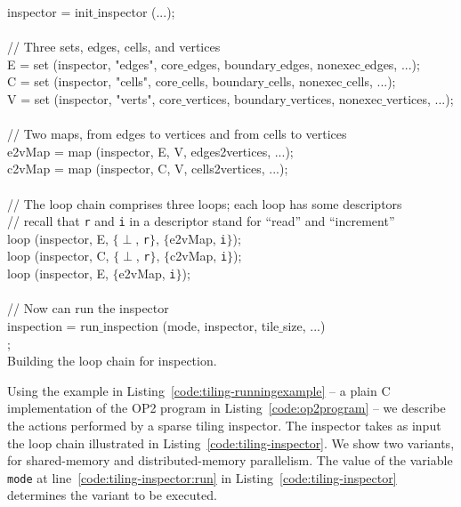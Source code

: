 \begin{algorithm}
\scriptsize\ttfamily
{}
inspector = init$\_$inspector (...);\\
~\\
// Three sets, edges, cells, and vertices\\
E = set (inspector, "edges", core$\_$edges, boundary$\_$edges, nonexec$\_$edges, ...);\\
C = set (inspector, "cells", core$\_$cells, boundary$\_$cells, nonexec$\_$cells, ...);\\
V = set (inspector, "verts", core$\_$vertices, boundary$\_$vertices, nonexec$\_$vertices, ...);\\ 
~\\
// Two maps, from edges to vertices and from cells to vertices\\
e2vMap = map (inspector, E, V, edges2vertices, ...);\\
c2vMap = map (inspector, C, V, cells2vertices, ...);\\
~\\
// The loop chain comprises three loops; each loop has some descriptors\\
// recall that {\tt r} and {\tt i} in a descriptor stand for ``read'' and ``increment''\\ 
loop (inspector, E, $\lbrace \perp$, {\tt r}$\rbrace$, $\lbrace$e2vMap, {\tt i}$\rbrace$);\\
loop (inspector, C, $\lbrace \perp$, {\tt r}$\rbrace$, $\lbrace$c2vMap, {\tt i}$\rbrace$);\\
loop (inspector, E, $\lbrace$e2vMap, {\tt i}$\rbrace$); \\
~\\
// Now can run the inspector\\
inspection = run$\_$inspection (mode, inspector, tile$\_$size, ...)\\ \label{code:tiling-inspector:run}
;\\
\caption{Building the loop chain for inspection.}
\label{code:tiling-inspector}
\end{algorithm}

Using the example in Listing~\ref{code:tiling-runningexample} -- a plain C implementation of the OP2 program in Listing~\ref{code:op2program} -- we describe the actions performed by a sparse tiling inspector. The inspector takes as input the loop chain illustrated in Listing~\ref{code:tiling-inspector}. We show two variants, for shared-memory and distributed-memory parallelism. The value of the variable \texttt{mode} at line~\ref{code:tiling-inspector:run} in Listing~\ref{code:tiling-inspector} determines the variant to be executed.

